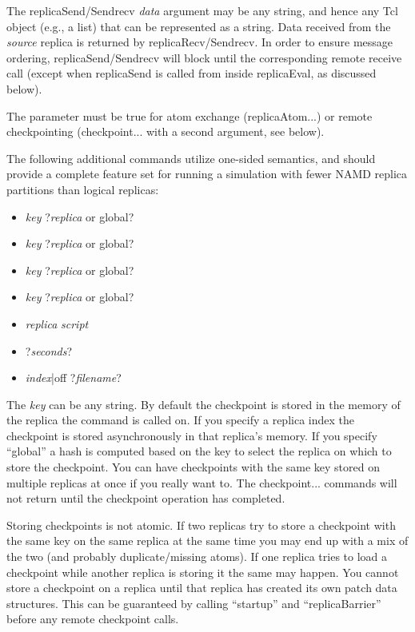 The replicaSend/Sendrecv {\em data} argument may be any string,
and hence any Tcl object (e.g., a list) that can be represented as a string.
Data received from the {\em source} replica is returned by replicaRecv/Sendrecv.
In order to ensure message ordering, replicaSend/Sendrecv will block
until the corresponding remote receive call (except when replicaSend
is called from inside replicaEval, as discussed below).

The parameter {} must be true for 
atom exchange (replicaAtom...) or remote checkpointing (checkpoint... with a second argument, see below).

The following additional commands utilize one-sided semantics,
and should provide a complete feature set for running a simulation with
fewer NAMD replica partitions than logical replicas:

\begin{itemize}
  \item {} {\em key} ?{\em replica} or global?
  \item {} {\em key} ?{\em replica} or global?
  \item {} {\em key} ?{\em replica} or global?
  \item {} {\em key} ?{\em replica} or global?
  \item {} {\em replica} {\em script}
  \item {} ?{\em seconds}?
  \item {} {\em index}|off ?{\em filename}?
\end{itemize}

The {\em key} can be any string.
By default the checkpoint is stored in the memory of the replica the command is called on.
If you specify a replica index the checkpoint is stored asynchronously in that replica's memory.
If you specify ``global'' a hash is computed based on the key to select the replica on which
to store the checkpoint.
You can have checkpoints with the same key stored on multiple replicas at once if you really want to.
The checkpoint... commands will not return until the checkpoint operation has completed.

Storing checkpoints is not atomic.
If two replicas try to store a checkpoint with the same key on the same replica at the same
time you may end up with a mix of the two (and probably duplicate/missing atoms).
If one replica tries to load a checkpoint while another replica is storing it the same may happen.
You cannot store a checkpoint on a replica until that replica has created its own patch data structures.
This can be guaranteed by calling ``startup'' and ``replicaBarrier'' before any remote checkpoint calls.

